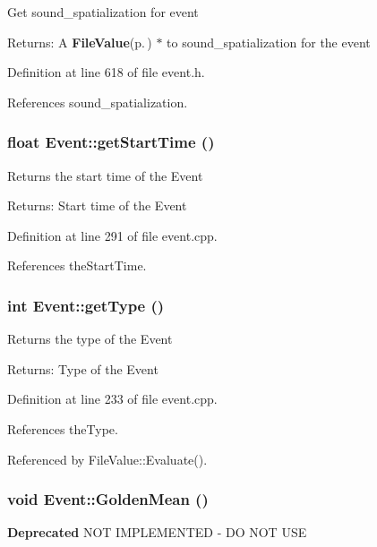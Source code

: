 Get sound\_\-spatialization for event \begin{Desc}
\item[Returns:]A {\bf File\-Value}{\rm (p.\,\pageref{classFileValue})} $\ast$ to sound\_\-spatialization for the event \end{Desc}


Definition at line 618 of file event.h.

References sound\_\-spatialization.
\subsubsection{\setlength{\rightskip}{0pt plus 5cm}float Event::get\-Start\-Time ()}\label{classEvent_a13}


Returns the start time of the Event \begin{Desc}
\item[Returns:]Start time of the Event \end{Desc}


Definition at line 291 of file event.cpp.

References the\-Start\-Time.
\subsubsection{\setlength{\rightskip}{0pt plus 5cm}int Event::get\-Type ()}\label{classEvent_a17}


Returns the type of the Event \begin{Desc}
\item[Returns:]Type of the Event \end{Desc}


Definition at line 233 of file event.cpp.

References the\-Type.

Referenced by File\-Value::Evaluate().
\subsubsection{\setlength{\rightskip}{0pt plus 5cm}void Event::Golden\-Mean ()}\label{classEvent_a41}


\begin{Desc}
\item[{\bf Deprecated}]NOT IMPLEMENTED - DO NOT USE \end{Desc}

